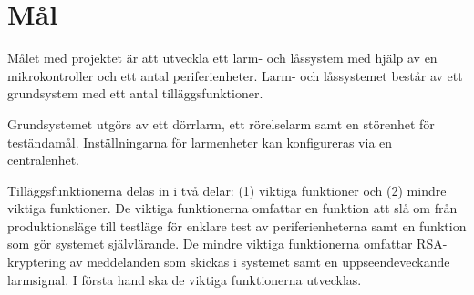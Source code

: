 \documentclass[a4paper]{article}
\begin{document}
\section*{Mål}

Målet med projektet är att utveckla ett larm- och låssystem med hjälp av en mikrokontroller och ett antal periferienheter.
Larm- och låssystemet består av ett grundsystem med ett antal tilläggsfunktioner.

Grundsystemet utgörs av ett dörrlarm, ett rörelselarm samt en störenhet för teständamål. Inställningarna för larmenheter kan konfigureras via en centralenhet.

Tilläggsfunktionerna delas in i två delar: (1) viktiga funktioner och (2) mindre viktiga funktioner. De viktiga funktionerna omfattar en funktion att slå om från produktionsläge till testläge för enklare test av periferienheterna samt en funktion som gör systemet självlärande.  De mindre viktiga funktionerna omfattar RSA-kryptering av meddelanden som skickas i systemet samt en uppseendeveckande larmsignal.
I första hand ska de viktiga funktionerna utvecklas.
\end{document}
